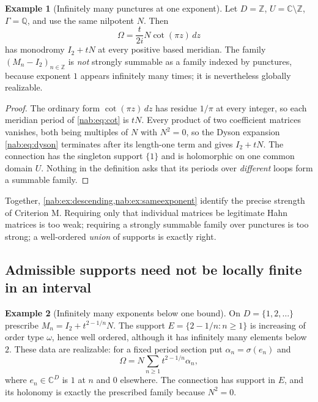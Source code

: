 \documentclass[11pt,letterpaper]{article}
\theoremstyle{definition}
\newtheorem{example}[example]{Example}
\theoremstyle{remark}
\newcommand{\C}{\mathbb C}
\newcommand{\Q}{\mathbb Q}
\newcommand{\Z}{\mathbb Z}
\numberwithin{equation}{section}
\begin{document}
\begin{example}[Infinitely many punctures at one exponent]
\label{nab:ex:sameexponent}
Let $D=\Z$, $U=\C\setminus\Z$, $\Gamma=\Q$, and use the same nilpotent $N$.
Then
\begin{equation}\label{nab:eq:cot}
 \Omega=\frac{t}{2i}N\cot(\pi z)\,dz
\end{equation}
has monodromy $I_2+tN$ at every positive based meridian. The family
$(M_n-I_2)_{n\in\Z}$ is \emph{not} strongly summable as a family indexed by
punctures, because exponent $1$ appears infinitely many times; it is
nevertheless globally realizable.
\end{example}

\begin{proof}
The ordinary form $\cot(\pi z)\,dz$ has residue $1/\pi$ at every integer, so
each meridian period of \eqref{nab:eq:cot} is $tN$. Every product of two
coefficient matrices vanishes, both being multiples of $N$ with $N^2=0$, so the
Dyson expansion \eqref{nab:eq:dyson} terminates after its length-one term and
gives $I_2+tN$. The connection has the singleton support $\{1\}$ and is
holomorphic on one common domain $U$. Nothing in the definition asks that its
periods over \emph{different} loops form a summable family.
\end{proof}

Together, \cref{nab:ex:descending,nab:ex:sameexponent} identify the precise
strength of Criterion M. Requiring only that individual matrices be legitimate
Hahn matrices is too weak; requiring a strongly summable family over punctures
is too strong; a well-ordered \emph{union} of supports is exactly right.

\subsection{Admissible supports need not be locally finite in an interval}

\begin{example}[Infinitely many exponents below one bound]
\label{nab:ex:boundedsupport}
On $D=\{1,2,\ldots\}$ prescribe $M_n=I_2+t^{2-1/n}N$. The support
$E=\{2-1/n:n\geq1\}$ is increasing of order type $\omega$, hence well ordered,
although it has infinitely many elements below $2$. These data are realizable:
for a fixed period section put $\alpha_n=\sigma(e_n)$ and
\[
 \Omega=N\sum_{n\geq1}t^{2-1/n}\alpha_n,
\]
where $e_n\in\C^D$ is $1$ at $n$ and $0$ elsewhere. The connection has support
in $E$, and its holonomy is exactly the prescribed family because $N^2=0$.
\end{example}
\end{document}
